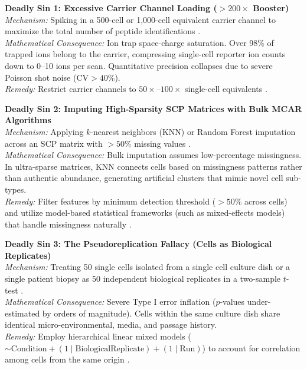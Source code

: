 \documentclass[11pt,twoside,openright]{book}
\begin{document}
\begin{pitfallbox}
\textbf{Deadly Sin 1: Excessive Carrier Channel Loading ($>200\times$ Booster)}\\
\textit{Mechanism:} Spiking in a 500-cell or 1,000-cell equivalent carrier channel to maximize the total number of peptide identifications \cite{slavov2021scope2, cheung2021carrier}.\\
\textit{Mathematical Consequence:} Ion trap space-charge saturation. Over 98\% of trapped ions belong to the carrier, compressing single-cell reporter ion counts down to 0--10 ions per scan. Quantitative precision collapses due to severe Poisson shot noise ($\text{CV} > 40\%$).\\
\textit{Remedy:} Restrict carrier channels to $50\times$--$100\times$ single-cell equivalents \cite{vanderaa2021scp}.
\end{pitfallbox}

\begin{pitfallbox}
\textbf{Deadly Sin 2: Imputing High-Sparsity SCP Matrices with Bulk MCAR Algorithms}\\
\textit{Mechanism:} Applying $k$-nearest neighbors (KNN) or Random Forest imputation across an SCP matrix with $>50\%$ missing values \cite{brunner2022ultra}.\\
\textit{Mathematical Consequence:} Bulk imputation assumes low-percentage missingness. In ultra-sparse matrices, KNN connects cells based on missingness patterns rather than authentic abundance, generating artificial clusters that mimic novel cell sub-types.\\
\textit{Remedy:} Filter features by minimum detection threshold ($>50\%$ across cells) and utilize model-based statistical frameworks (such as mixed-effects models) that handle missingness naturally \cite{choi2014msstats}.
\end{pitfallbox}

\begin{pitfallbox}
\textbf{Deadly Sin 3: The Pseudoreplication Fallacy (Cells as Biological Replicates)}\\
\textit{Mechanism:} Treating 50 single cells isolated from a single cell culture dish or a single patient biopsy as 50 independent biological replicates in a two-sample $t$-test \cite{squair2021confronting, zimmerman2021practical}.\\
\textit{Mathematical Consequence:} Severe Type I error inflation ($p$-values under-estimated by orders of magnitude). Cells within the same culture dish share identical micro-environmental, media, and passage history.\\
\textit{Remedy:} Employ hierarchical linear mixed models ($\sim \text{Condition} + (1 \mid \text{BiologicalReplicate}) + (1 \mid \text{Run})$) to account for correlation among cells from the same origin \cite{bates2015fitting}.
\end{pitfallbox}
\end{document}
